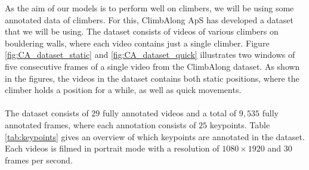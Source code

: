 \documentclass[./main.tex]{subfiles}
\begin{document}
As the aim of our models is to perform well on climbers, we will be using some annotated data of climbers. For this, ClimbAlong ApS has developed a dataset that we will be using. The dataset consists of videos of various climbers on bouldering walls, where each video contains just a single climber. Figure \ref{fig:CA_dataset_static} and \ref{fig:CA_dataset_quick} illustrates two windows of five consecutive frames of a single video from the ClimbAlong dataset. As shown in the figures, the videos in the dataset contains both static positions, where the climber holds a position for a while, as well as quick movements.
\\
\\
The dataset consists of $29$ fully annotated videos and a total of $9,535$ fully annotated frames, where each annotation consists of $25$ keypoints. Table \ref{tab:keypoints} gives an overview of which keypoints are annotated in the dataset. Each videos is filmed in portrait mode with a resolution of $1080 \times 1920$ and $30$ frames per second.
\end{document}

